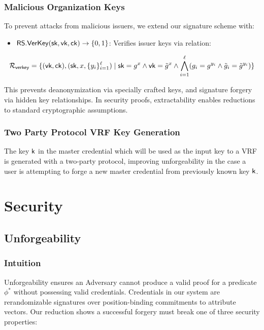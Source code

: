 \subsubsection{Malicious Organization Keys}
To prevent attacks from malicious issuers, we extend our signature scheme with:
\begin{itemize}
    \item $\mathsf{RS.VerKey}(\mathsf{sk}, \mathsf{vk}, \mathsf{ck}) \to \{0,1\}$: Verifies issuer keys via relation:
\end{itemize}
\[
\mathcal{R}_{\mathsf{verkey}} = \{(\mathsf{vk}, \mathsf{ck}),(\mathsf{sk}, x, \{y_i\}_{i=1}^\ell) \mid \mathsf{sk} = g^x \wedge \mathsf{vk} = \tilde{g}^x \wedge \bigwedge_{i=1}^\ell (g_i = g^{y_i} \wedge \tilde{g}_i = \tilde{g}^{y_i})\}
\]

This prevents deanonymization via specially crafted keys, and signature forgery via hidden key relationships. In security proofs, extractability enables reductions to standard cryptographic assumptions.

\subsubsection{Two Party Protocol VRF Key Generation}
The key $\mathsf{k}$ in the master credential which will be used as the input key to a VRF is generated with a two-party protocol, improving unforgeability in the case a user is attempting to forge a new master credential from previously known key $\mathsf{k}$.





\section{\MIMCABC Security}

\subsection{Unforgeability} \label{sec:unforgeability}
\subsubsection{Intuition}
Unforgeability ensures an Adversary cannot produce a valid proof for a predicate $\phi^*$ without possessing valid credentials. Credentials in our system are rerandomizable signatures over position-binding commitments to attribute vectors. Our reduction shows a successful forgery must break one of three security properties:



